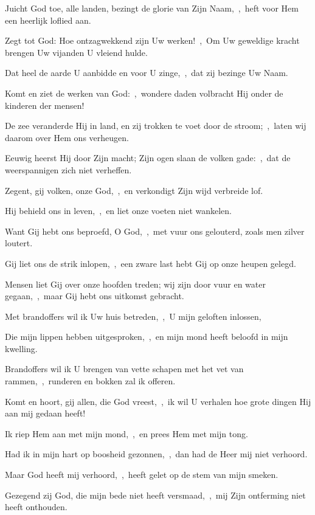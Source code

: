 \documentclass[12pt,twoside,a5paper]{article}
\begin{document}
\begin{halfparskip}
   Juicht God toe, alle landen, bezingt de glorie van Zijn Naam,~\sep\ heft voor Hem een heerlijk loflied aan.

  Zegt tot God: Hoe ontzagwekkend zijn Uw werken!~\sep\ Om Uw geweldige kracht brengen Uw vijanden U vleiend hulde.

  Dat heel de aarde U aanbidde en voor U zinge,~\sep\ dat zij bezinge Uw Naam.

  Komt en ziet de werken van God:~\sep\ wondere daden volbracht Hij onder de kinderen der mensen!

  De zee veranderde Hij in land, en zij trokken te voet door de stroom;~\sep\ laten wij daarom over Hem ons verheugen.

  Eeuwig heerst Hij door Zijn macht; Zijn ogen slaan de volken gade:~\sep\ dat de weerspannigen zich niet verheffen.

  Zegent, gij volken, onze God,~\sep\ en verkondigt Zijn wijd verbreide lof.

  Hij behield ons in leven,~\sep\ en liet onze voeten niet wankelen.

  Want Gij hebt ons beproefd, O God,~\sep\ met vuur ons gelouterd, zoals men zilver loutert.

  Gij liet ons de strik inlopen,~\sep\ een zware last hebt Gij op onze heupen gelegd.

  Mensen liet Gij over onze hoofden treden; wij zijn door vuur en water gegaan,~\sep\ maar Gij hebt ons uitkomst gebracht.

  Met brandoffers wil ik Uw huis betreden,~\sep\ U mijn geloften inlossen,

  Die mijn lippen hebben uitgesproken,~\sep\ en mijn mond heeft beloofd in mijn kwelling.

  Brandoffers wil ik U brengen van vette schapen met het vet van rammen,~\sep\ runderen en bokken zal ik offeren.

  Komt en hoort, gij allen, die God vreest,~\sep\ ik wil U verhalen hoe grote dingen Hij aan mij gedaan heeft!

  Ik riep Hem aan met mijn mond,~\sep\ en prees Hem met mijn tong.

  Had ik in mijn hart op boosheid gezonnen,~\sep\ dan had de Heer mij niet verhoord.

  Maar God heeft mij verhoord,~\sep\ heeft gelet op de stem van mijn smeken.

  Gezegend zij God, die mijn bede niet heeft versmaad,~\sep\ mij Zijn ontferming niet heeft onthouden.
\end{halfparskip}
\end{document}

